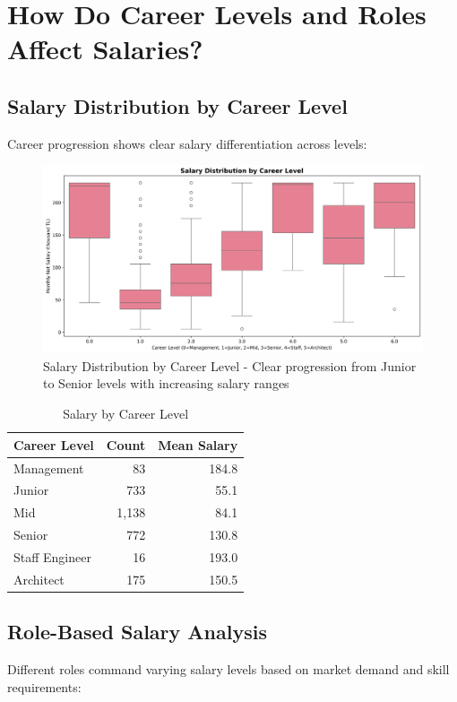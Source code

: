 \documentclass[12pt,a4paper]{article}
\begin{document}
\section{How Do Career Levels and Roles Affect Salaries?}

\subsection{Salary Distribution by Career Level}
Career progression shows clear salary differentiation across levels:

\begin{figure}[H]
    \centering
    \includegraphics[width=\textwidth]{figures/boxplot_seniority.png}
    \caption{Salary Distribution by Career Level - Clear progression from Junior to Senior levels with increasing salary ranges}
\end{figure}

\begin{table}[H]
\centering
\begin{tabular}{lrr}
\toprule
\textbf{Career Level} & \textbf{Count} & \textbf{Mean Salary} \\
\midrule
Management & 83 & 184.8 \\
Junior & 733 & 55.1 \\
Mid & 1,138 & 84.1 \\
Senior & 772 & 130.8 \\
Staff Engineer & 16 & 193.0 \\
Architect & 175 & 150.5 \\

\bottomrule
\end{tabular}
\caption{Salary by Career Level}
\end{table}

\subsection{Role-Based Salary Analysis}
Different roles command varying salary levels based on market demand and skill requirements:
\end{document}
